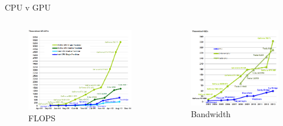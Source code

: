\documentclass[10pt,times]{beamer}
\begin{document}
\begin{frame}{CPU v GPU}
\begin{columns}
\begin{figure}
\includegraphics[width=\linewidth]{figs/CPU_GPU_FLOPS.png}
\caption*{FLOPS}
\end{figure}
\begin{figure}
\includegraphics[width=\linewidth]{figs/CPU_GPU_Bandwidth.png}
\caption*{Bandwidth}
\end{figure}
\end{columns}
\end{frame}
\end{document}
